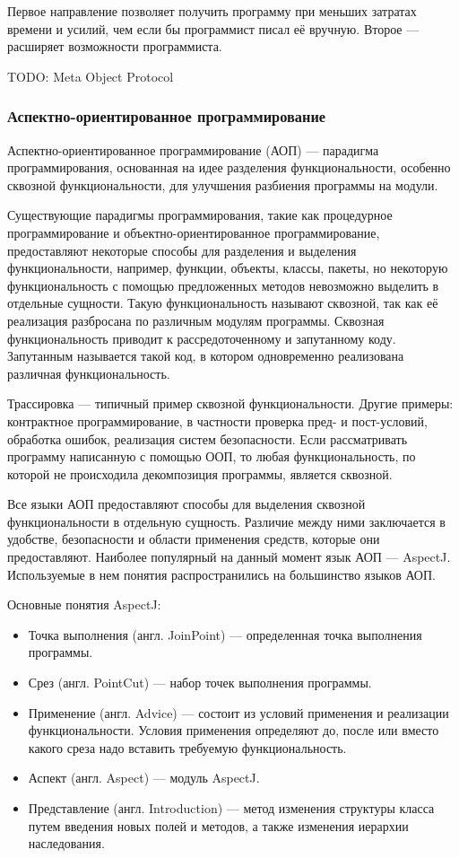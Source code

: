 \documentclass[a4paper,12pt]{article}
\begin{document}
Первое направление позволяет получить программу при меньших затратах времени и
усилий, чем если бы программист писал её вручную. Второе — расширяет
возможности программиста.

TODO: Meta Object Protocol

\subsubsection{Аспектно-ориентированное программирование}
Аспектно-ориентированное программирование (АОП) — парадигма программирования,
основанная на идее разделения функциональности, особенно сквозной
функциональности, для улучшения разбиения программы на модули.

Существующие парадигмы программирования, такие как процедурное программирование
и объектно-ориентированное программирование, предоставляют некоторые способы
для разделения и выделения функциональности, например, функции, объекты,
классы, пакеты, но некоторую функциональность с помощью предложенных методов
невозможно выделить в отдельные сущности. Такую функциональность называют
сквозной, так как её реализация разбросана по различным модулям программы.
Сквозная функциональность приводит к рассредоточенному и запутанному коду.
Запутанным называется такой код, в котором одновременно реализована различная
функциональность.

Трассировка — типичный пример сквозной функциональности. Другие примеры:
контрактное программирование, в частности проверка пред- и пост-условий,
обработка ошибок, реализация систем безопасности. Если рассматривать программу
написанную с помощью ООП, то любая функциональность, по которой не происходила
декомпозиция программы, является сквозной.

Все языки АОП предоставляют способы для выделения сквозной функциональности в
отдельную сущность. Различие между ними заключается в удобстве, безопасности и
области применения средств, которые они предоставляют. Наиболее популярный на
данный момент язык АОП — AspectJ. Используемые в нем понятия распространились
на большинство языков АОП.

Основные понятия AspectJ:
\begin{itemize}
 \item Точка выполнения (англ. JoinPoint) — определенная точка выполнения программы.
 \item Срез (англ. PointCut) — набор точек выполнения программы.
 \item Применение (англ. Advice) — состоит из условий применения и реализации
 функциональности. Условия применения определяют до, после или вместо какого
 среза надо вставить требуемую функциональность.  
 \item Аспект (англ. Aspect) — модуль AspectJ.
 \item Представление (англ. Introduction) — метод изменения структуры класса
 путем введения новых полей и методов, а также изменения иерархии наследования.
\end{itemize}
\end{document}

